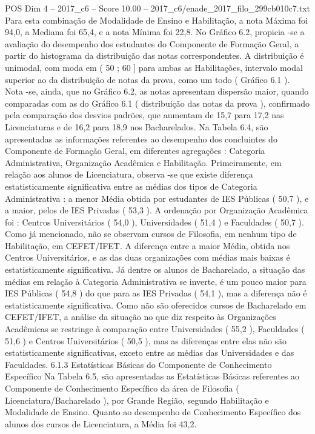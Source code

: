 \begin{textsample}{POS Dim 4 – 2017\_c6 – Score 10.00 – 2017\_c6/enade\_2017\_filo\_299cb010c7.txt}
Para esta combinação de Modalidade de Ensino e Habilitação, a nota Máxima foi 94,0, a Mediana foi 65,4, e a nota Mínima foi 22,8.
No Gráfico 6.2, propicia -se a avaliação do desempenho dos estudantes do Componente de Formação Geral, a partir do histograma da distribuição das notas correspondentes.
A distribuição é unimodal, com moda em ( 50 ; 60 ] para ambas as Habilitações, intervalo modal superior ao da distribuição de notas da prova, como um todo ( Gráfico 6.1 ).
Nota -se, ainda, que no Gráfico 6.2, as notas apresentam dispersão maior, quando comparadas com as do Gráfico 6.1 ( distribuição das notas da prova ), confirmado pela comparação dos desvios padrões, que aumentam de 15,7 para 17,2 nas Licenciaturas e de 16,2 para 18,9 nos Bacharelados.
Na Tabela 6.4, são apresentadas as informações referentes ao desempenho dos concluintes do Componente de Formação Geral, em diferentes agregações : Categoria Administrativa, Organização Acadêmica e Habilitação.
Primeiramente, em relação aos alunos de Licenciatura, observa -se que existe diferença estatisticamente significativa entre as médias dos tipos de Categoria Administrativa : a menor Média obtida por estudantes de IES Públicas ( 50,7 ), e a maior, pelos de IES Privadas ( 53,3 ).
A ordenação por Organização Acadêmica foi : Centros Universitários ( 54,0 ), Universidades ( 51,4 ) e Faculdades ( 50,7 ).
Como já mencionado, não se observam cursos de Filosofia, em nenhum tipo de Habilitação, em CEFET/IFET.
A diferença entre a maior Média, obtida nos Centros Universitários, e as das duas organizações com médias mais baixas é estatisticamente significativa.
Já dentre os alunos de Bacharelado, a situação das médias em relação à Categoria Administrativa se inverte, é um pouco maior para IES Públicas ( 54,8 ) do que para as IES Privadas ( 54,1 ), mas a diferença não é estatisticamente significativa.
Como não são oferecidos cursos de Bacharelado em CEFET/IFET, a análise da situação no que diz respeito às Organizações Acadêmicas se restringe à comparação entre Universidades ( 55,2 ), Faculdades ( 51,6 ) e Centros Universitários ( 50,5 ), mas as diferenças entre elas não são estatisticamente significativas, exceto entre as médias das Universidades e das Faculdades. 6.1.3 Estatísticas Básicas do Componente de Conhecimento Específico Na Tabela 6.5, são apresentadas as Estatísticas Básicas referentes ao Componente de Conhecimento Específico da área de Filosofia ( Licenciatura/Bacharelado ), por Grande Região, segundo Habilitação e Modalidade de Ensino.
Quanto ao desempenho de Conhecimento Específico dos alunos dos cursos de Licenciatura, a Média foi 43,2.

\end{textsample}
